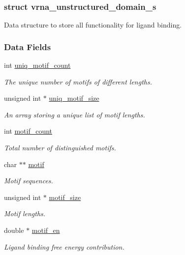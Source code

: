\subsubsection{struct vrna\+\_\+unstructured\+\_\+domain\+\_\+s}
Data structure to store all functionality for ligand binding. \subsubsection*{Data Fields}
\begin{DoxyCompactItemize}
\item 
int \mbox{\hyperlink{group__domains__up_ae17005ef8043aca2fc3864804cd5def6}{uniq\+\_\+motif\+\_\+count}}
\begin{DoxyCompactList}\small\item\em The unique number of motifs of different lengths. \end{DoxyCompactList}\item 
unsigned int $\ast$ \mbox{\hyperlink{group__domains__up_a2b484b0e19a47145db7055ada8b14159}{uniq\+\_\+motif\+\_\+size}}
\begin{DoxyCompactList}\small\item\em An array storing a unique list of motif lengths. \end{DoxyCompactList}\item 
int \mbox{\hyperlink{group__domains__up_a5ad34148ea1d2e501f3e02029449546e}{motif\+\_\+count}}
\begin{DoxyCompactList}\small\item\em Total number of distinguished motifs. \end{DoxyCompactList}\item 
char $\ast$$\ast$ \mbox{\hyperlink{group__domains__up_af285436bbdea4436ad2cedec65d48c75}{motif}}
\begin{DoxyCompactList}\small\item\em Motif sequences. \end{DoxyCompactList}\item 
unsigned int $\ast$ \mbox{\hyperlink{group__domains__up_a6a9f89ab7d147eb0ffd6cf8d77d178c0}{motif\+\_\+size}}
\begin{DoxyCompactList}\small\item\em Motif lengths. \end{DoxyCompactList}\item 
double $\ast$ \mbox{\hyperlink{group__domains__up_aae4f0a45419784fb7c244bce2781403d}{motif\+\_\+en}}
\begin{DoxyCompactList}\small\item\em Ligand binding free energy contribution. \end{DoxyCompactList}\item 
$$
\end{DoxyCompactItemize}
